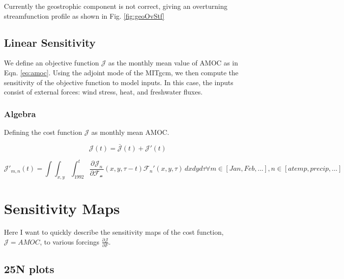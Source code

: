 \documentclass[a4paper,11pt]{article}
\newcommand{\pderiv}[3][]{%
  \ensuremath{\frac{\partial^{#1} {#2}}{\partial {#3}^{#1}}}}
\begin{document}
    Currently the geostrophic component is not correct, giving an overturning streamfunction profile as shown in Fig. \ref{fig:geoOvStf}
    

   
  \subsection{Linear Sensitivity}
  \label{linearSensitivity}
  
  We define an objective function $\mathcal{J}$ as the monthly mean value of AMOC as in Eqn. \ref{eq:amoc}. Using the adjoint mode of the MITgcm, we then compute the sensitivity of the objective function to model inputs. In this case, the inputs consist of external forces: wind stress, heat, and freshwater fluxes. 
  

	\subsubsection{Algebra}
	
	Defining the cost function $\mathcal{J}$ as monthly mean AMOC. 

	\begin{equation}
	  \mathcal{J}(t) = \bar{\mathcal{J}}(t) + \mathcal{J}'(t)
	\end{equation}

	\begin{equation}
	  \mathcal{J}'_{m,n}(t) = \int\int_{x,y}\int_{1992}^{t}\pderiv{\mathcal{J}_n}{\mathcal{F_n}}(x,y,\tau-t)\mathcal{F}_n'(x,y,\tau)\,dxdyd\tau \forall m \in [Jan, Feb,...], n \in [atemp, precip,...]
	\end{equation}


 \section{Sensitivity Maps}

  Here I want to quickly describe the sensitivity maps of the cost function, $\mathcal{J} = AMOC$, to various forcings $\pderiv{\mathcal{J}}{F}$. 

    \subsection{25N plots}
\end{document}
